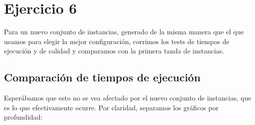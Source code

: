 \section{Ejercicio 6}

Para un nuevo conjunto de instancias, generado de la misma manera que el que usamos para elegir la mejor configuración, corrimos los tests de tiempos de ejecución y de calidad y comparamos con la primera tanda de instancias.

\subsection{Comparación de tiempos de ejecución}

Esperábamos que esto no se vea afectado por el nuevo conjunto de instancias, que es lo que efectivamente ocurre. Por claridad, separamos los gráficos por profundidad:

\begin{figure}[H]
    \begin{minipage}[t]{\linewidth}
		\centering
		\label{fig:ejercicio-6-tiempos-grasp-2-2}
    \end{minipage}
\end{figure}

